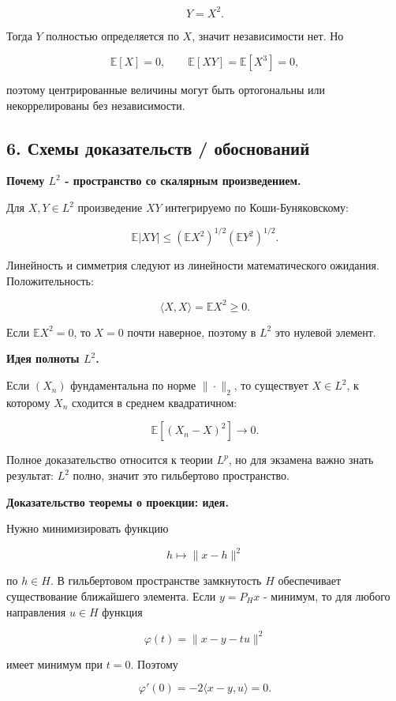 \documentclass[
  11pt,
  a4paper,
]{article}
\begin{document}
\[
Y=X^2.
\]

Тогда \(Y\) полностью определяется по \(X\), значит независимости нет.
Но

\[
\mathbb E[X]=0,
\qquad
\mathbb E[XY]=\mathbb E[X^3]=0,
\]

поэтому центрированные величины могут быть ортогональны или
некоррелированы без независимости.

\subsection{6. Схемы доказательств /
обоснований}\label{ux441ux445ux435ux43cux44b-ux434ux43eux43aux430ux437ux430ux442ux435ux43bux44cux441ux442ux432-ux43eux431ux43eux441ux43dux43eux432ux430ux43dux438ux439}

\textbf{Почему \(L^2\) - пространство со скалярным произведением.}

Для \(X,Y\in L^2\) произведение \(XY\) интегрируемо по
Коши-Буняковскому:

\[
\mathbb E|XY|
\le
(\mathbb EX^2)^{1/2}(\mathbb EY^2)^{1/2}.
\]

Линейность и симметрия следуют из линейности математического ожидания.
Положительность:

\[
\langle X,X\rangle=\mathbb EX^2\ge0.
\]

Если \(\mathbb EX^2=0\), то \(X=0\) почти наверное, поэтому в \(L^2\)
это нулевой элемент.

\textbf{Идея полноты \(L^2\).}

Если \((X_n)\) фундаментальна по норме \(\|\cdot\|_2\), то существует
\(X\in L^2\), к которому \(X_n\) сходится в среднем квадратичном:

\[
\mathbb E[(X_n-X)^2]\to0.
\]

Полное доказательство относится к теории \(L^p\), но для экзамена важно
знать результат: \(L^2\) полно, значит это гильбертово пространство.

\textbf{Доказательство теоремы о проекции: идея.}

Нужно минимизировать функцию

\[
h\mapsto\|x-h\|^2
\]

по \(h\in H\). В гильбертовом пространстве замкнутость \(H\)
обеспечивает существование ближайшего элемента. Если \(y=P_Hx\) -
минимум, то для любого направления \(u\in H\) функция

\[
\varphi(t)=\|x-y-tu\|^2
\]

имеет минимум при \(t=0\). Поэтому

\[
\varphi'(0)=-2\langle x-y,u\rangle=0.
\]
\end{document}
